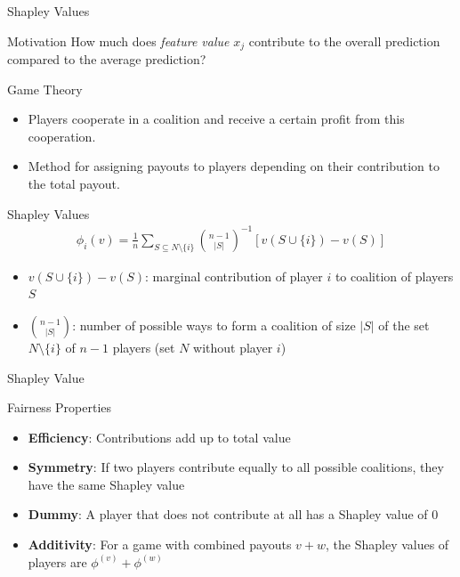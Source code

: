 \documentclass[ignorenonframetext,xcolor=x11names]{beamer}
\begin{document}
\begin{frame}{Shapley Values}
\begin{block}{Motivation}
How much does \emph{feature value} $x_j$ contribute to the overall prediction compared to the average prediction?
\end{block}

\begin{block}{Game Theory}
\begin{itemize}
\item Players cooperate in a coalition and receive a certain profit from this cooperation.
\item Method for assigning payouts to players depending on their contribution to the total payout. 
\end{itemize}
\end{block}

\end{frame}

\begin{frame}{Shapley Values}
\begin{align*}
\phi_i(v) = \frac{1}{n} \sum_{S \subseteq N \setminus \{i\}} \binom{n-1}{|S|}^{-1} \left[ v(S \cup \{i\}) - v(S)\right]
\end{align*}

\begin{itemize}
\item $v(S \cup \{i\}) - v(S)$: marginal contribution of player $i$ to coalition of players $S$
\item $\binom{n-1}{|S|}$: number of possible ways to form a coalition of size $|S|$ of the set $N \setminus \{i\}$ of $n-1$ players (set $N$ without player $i$)
\end{itemize}
\end{frame}

\begin{frame}{Shapley Value}
\begin{block}{Fairness Properties}
\begin{itemize}
   \item \textbf{Efficiency}: Contributions add up to total value
   \item \textbf{Symmetry}: If two players contribute equally to all possible coalitions, they have the same Shapley value
   \item \textbf{Dummy}: A player that does not contribute at all has a Shapley value of $0$
   \item \textbf{Additivity}: For a game with combined payouts $v + w$, the Shapley values of players are $\phi^{(v)} + \phi^{(w)}$
\end{itemize}
\end{block}
\end{frame}
\end{document}
